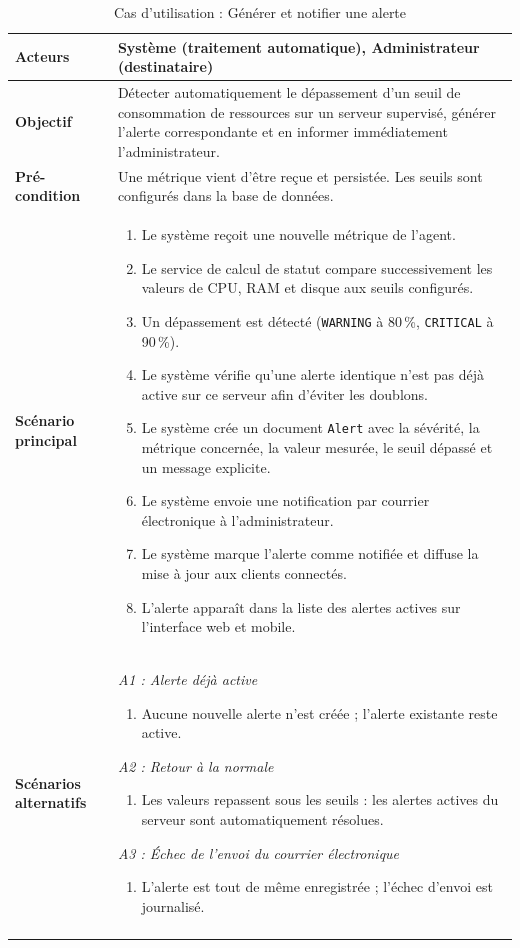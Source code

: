 \renewcommand{\arraystretch}{1.4}
\begin{longtable}{|p{3.0cm}|>{\raggedright\arraybackslash}p{11.4cm}|}
\hline
\textbf{Acteurs} & Système (traitement automatique), Administrateur (destinataire) \\
\hline
\textbf{Objectif} & Détecter automatiquement le dépassement d'un seuil de consommation
de ressources sur un serveur supervisé, générer l'alerte correspondante et en informer
immédiatement l'administrateur. \\
\hline
\textbf{Pré-condition} & Une métrique vient d'être reçue et persistée. Les seuils sont
configurés dans la base de données. \\
\hline
\textbf{Scénario principal} &
\begin{enumerate}[leftmargin=*, nosep]
  \item Le système reçoit une nouvelle métrique de l'agent.
  \item Le service de calcul de statut compare successivement les valeurs de CPU, RAM et
        disque aux seuils configurés.
  \item Un dépassement est détecté (\texttt{WARNING} à 80\,\%, \texttt{CRITICAL} à
        90\,\%).
  \item Le système vérifie qu'une alerte identique n'est pas déjà active sur ce serveur
        afin d'éviter les doublons.
  \item Le système crée un document \texttt{Alert} avec la sévérité, la métrique
        concernée, la valeur mesurée, le seuil dépassé et un message explicite.
  \item Le système envoie une notification par courrier électronique à l'administrateur.
  \item Le système marque l'alerte comme notifiée et diffuse la mise à jour aux clients
        connectés.
  \item L'alerte apparaît dans la liste des alertes actives sur l'interface web et
        mobile.
\end{enumerate} \\
\hline
\textbf{Scénarios alternatifs} &
\textit{A1 : Alerte déjà active}
\begin{enumerate}[leftmargin=*, nosep]
  \item Aucune nouvelle alerte n'est créée ; l'alerte existante reste active.
\end{enumerate}
\textit{A2 : Retour à la normale}
\begin{enumerate}[leftmargin=*, nosep]
  \item Les valeurs repassent sous les seuils : les alertes actives du serveur sont
        automatiquement résolues.
\end{enumerate}
\textit{A3 : Échec de l'envoi du courrier électronique}
\begin{enumerate}[leftmargin=*, nosep]
  \item L'alerte est tout de même enregistrée ; l'échec d'envoi est journalisé.
\end{enumerate} \\
\hline
\caption{Cas d'utilisation : Générer et notifier une alerte}
\label{tab:cu-alerte}
\end{longtable}

